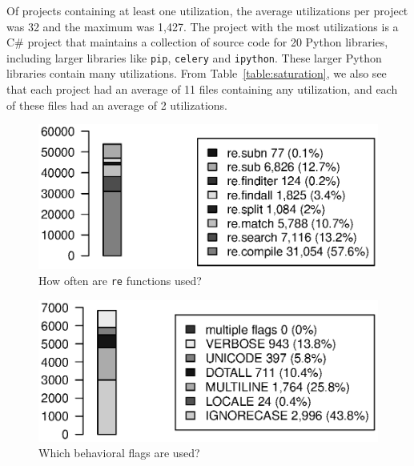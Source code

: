Of projects containing at least one utilization, the average utilizations per project was 32 and the maximum  was 1,427.  The project with the most utilizations is a C\# project that maintains a collection of source code for 20 Python libraries, including larger libraries like {\tt pip}, {\tt celery} and {\tt ipython}.  These larger Python libraries contain many utilizations.
From Table~\ref{table:saturation}, we also see that each project had an average of 11 files containing any utilization, and each of these files had an average of 2 utilizations.

\begin{figure}[tb]
\centering
\includegraphics[width=\columnwidth]{nontex/illustrations/partFunctions.eps}
\vspace{-12pt}
\caption{How often are  {\tt re} functions used?}
\vspace{-6pt}
\label{fig:partFunctions}
\end{figure}

\begin{figure}[tb]
\centering
\includegraphics[width=0.9\columnwidth]{nontex/illustrations/partFlags.eps}
\vspace{-6pt}
\caption{Which behavioral flags are used?}
\vspace{-6pt}
\label{fig:partFlags}
\end{figure}


